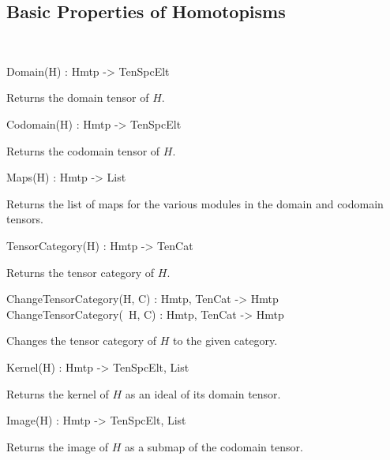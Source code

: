\subsection{Basic Properties of Homotopisms}~

\begin{intrinsics}
Domain(H) : Hmtp -> TenSpcElt
\end{intrinsics}

Returns the domain tensor of $H$.

\begin{intrinsics}
Codomain(H) : Hmtp -> TenSpcElt
\end{intrinsics}

Returns the codomain tensor of $H$.

\begin{intrinsics}
Maps(H) : Hmtp -> List
\end{intrinsics}

Returns the list of maps for the various modules in the domain and codomain 
tensors.

\begin{intrinsics}
TensorCategory(H) : Hmtp -> TenCat
\end{intrinsics}

Returns the tensor category of $H$.

\begin{intrinsics}
ChangeTensorCategory(H, C) : Hmtp, TenCat -> Hmtp
ChangeTensorCategory(~H, C) : Hmtp, TenCat -> Hmtp
\end{intrinsics}

Changes the tensor category of $H$ to the given category.

\begin{intrinsics}
Kernel(H) : Hmtp -> TenSpcElt, List
\end{intrinsics}

Returns the kernel of $H$ as an ideal of its domain tensor.

\begin{intrinsics}
Image(H) : Hmtp -> TenSpcElt, List
\end{intrinsics}

Returns the image of $H$ as a submap of the codomain tensor.

